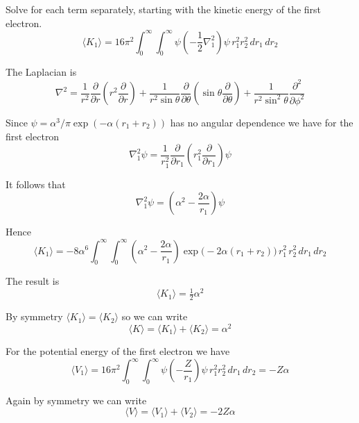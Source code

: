 Solve for each term separately, starting with the kinetic energy of the first electron.
\begin{equation*}
\langle K_1\rangle
=16\pi^2\int_0^\infty\int_0^\infty\psi\left(-\frac{1}{2}\nabla_1^2\right)\psi
\,r_1^2r_2^2
\,dr_1\,dr_2
\end{equation*}

The Laplacian is
\begin{equation*}
\nabla^2=\frac{1}{r^2}\frac{\partial}{\partial r}
\left(r^2\frac{\partial}{\partial r}\right)
+
\frac{1}{r^2\sin\theta}\frac{\partial}{\partial\theta}
\left(\sin\theta\frac{\partial}{\partial\theta}\right)
+
\frac{1}{r^2\sin^2\theta}\frac{\partial^2}{\partial\phi^2}
\end{equation*}

Since $\psi=\alpha^3/\pi\exp(-\alpha(r_1+r_2))$ has no angular dependence we have for the first electron
\begin{equation*}
\nabla^2_1\psi
=\frac{1}{r_1^2}\frac{\partial}{\partial r_1}\left(r_1^2\frac{\partial}{\partial r_1}\right)\psi
\end{equation*}

It follows that
\begin{equation*}
\nabla^2_1\psi=\left(\alpha^2-\frac{2\alpha}{r_1}\right)\psi
\end{equation*}

Hence
\begin{equation*}
\langle K_1\rangle=-8\alpha^6\int_0^\infty\int_0^\infty
\left(\alpha^2-\frac{2\alpha}{r_1}\right)\exp\bigl(-2\alpha(r_1+r_2)\bigr)
\,r_1^2\,r_2^2
\,dr_1\,dr_2
\end{equation*}

The result is
\begin{equation*}
\langle K_1\rangle=\tfrac{1}{2}\alpha^2
\tag{2}
\end{equation*}

By symmetry $\langle K_1\rangle=\langle K_2\rangle$ so we can write
\begin{equation*}
\langle K\rangle=\langle K_1\rangle+\langle K_2\rangle=\alpha^2
\end{equation*}

For the potential energy of the first electron we have
\begin{equation*}
\langle V_1\rangle
=
16\pi^2\int_0^\infty\int_0^\infty\psi\left(-\frac{Z}{r_1}\right)\psi
\,r_1^2r_2^2
\,dr_1\,dr_2
=-Z\alpha
\tag{3}
\end{equation*}

Again by symmetry we can write
\begin{equation*}
\langle V\rangle=\langle V_1\rangle+\langle V_2\rangle=-2Z\alpha
\end{equation*}

